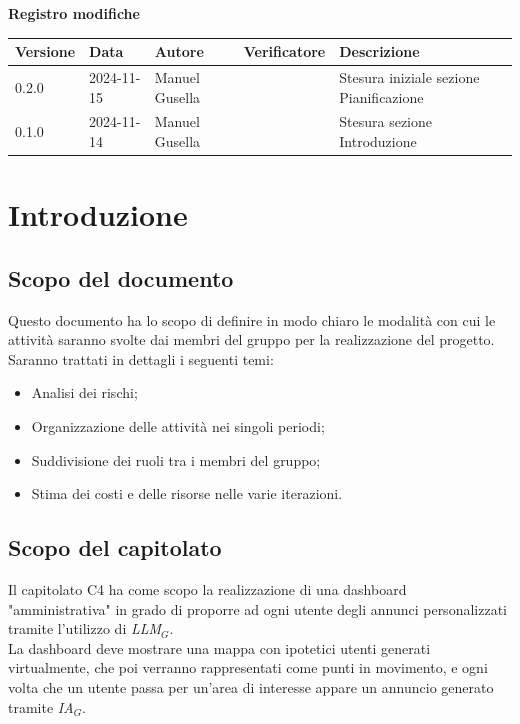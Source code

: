 \documentclass[12pt]{article}
\begin{document}
\setcounter{page}{1}
\begin{center}
\textbf{Registro modifiche}\\
\vspace{2mm}
\begin{tabularx}{\textwidth}{|l|l|l|l|X|}
\hline
\textbf{Versione} & \textbf{Data} & \textbf{Autore} & \textbf{Verificatore} & \textbf{Descrizione}\\
\hline
0.2.0 & 2024-11-15 & Manuel Gusella & & Stesura iniziale sezione Pianificazione\\
\hline
0.1.0 & 2024-11-14  & Manuel Gusella &   & Stesura sezione Introduzione\\
\hline

\end{tabularx}   
\end{center}
\newpage
\tableofcontents
\newpage
\section{Introduzione}
\subsection{Scopo del documento}
Questo documento ha lo scopo di definire in modo chiaro le modalità con cui le attività saranno svolte dai membri del gruppo per la realizzazione del progetto.\\
Saranno trattati in dettagli i seguenti temi:
\begin{itemize}
    \item Analisi dei rischi;
    \item Organizzazione delle attività nei singoli periodi;
    \item Suddivisione dei ruoli tra i membri del gruppo;
    \item Stima dei costi e delle risorse nelle varie iterazioni.
\end{itemize}

\subsection{Scopo del capitolato}
Il capitolato C4 ha come scopo la realizzazione di una dashboard "amministrativa" in grado di proporre ad ogni utente degli annunci personalizzati tramite l'utilizzo di \textit{LLM}$_G$.\\ La dashboard deve mostrare una mappa con ipotetici utenti generati virtualmente, che poi verranno rappresentati come punti in movimento, e ogni volta che un utente passa per un'area di interesse appare un annuncio generato tramite \textit{IA}$_G$.
\end{document}
